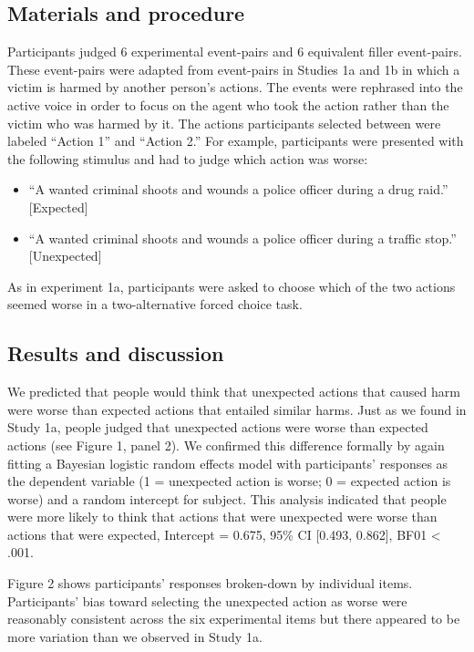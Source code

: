 \documentclass[10pt, letterpaper]{article}
\begin{document}
\subsection{Materials and procedure}\label{materials-and-procedure-1}

Participants judged 6 experimental event-pairs and 6 equivalent filler
event-pairs. These event-pairs were adapted from event-pairs in Studies
1a and 1b in which a victim is harmed by another person's actions. The
events were rephrased into the active voice in order to focus on the
agent who took the action rather than the victim who was harmed by it.
The actions participants selected between were labeled ``Action 1'' and
``Action 2.'' For example, participants were presented with the
following stimulus and had to judge which action was worse:

\begin{itemize}
\item
  ``A wanted criminal shoots and wounds a police officer during a drug
  raid.'' {[}Expected{]}
\item
  ``A wanted criminal shoots and wounds a police officer during a
  traffic stop.'' {[}Unexpected{]}
\end{itemize}

As in experiment 1a, participants were asked to choose which of the two
actions seemed worse in a two-alternative forced choice task.

\subsection{Results and discussion}\label{results-and-discussion-1}

We predicted that people would think that unexpected actions that caused
harm were worse than expected actions that entailed similar harms. Just
as we found in Study 1a, people judged that unexpected actions were
worse than expected actions (see Figure 1, panel 2). We confirmed this
difference formally by again fitting a Bayesian logistic random effects
model with participants' responses as the dependent variable (1 =
unexpected action is worse; 0 = expected action is worse) and a random
intercept for subject. This analysis indicated that people were more
likely to think that actions that were unexpected were worse than
actions that were expected, Intercept = 0.675, 95\% CI {[}0.493,
0.862{]}, BF01 \textless{} .001.

Figure 2 shows participants' responses broken-down by individual items.
Participants' bias toward selecting the unexpected action as worse were
reasonably consistent across the six experimental items but there
appeared to be more variation than we observed in Study 1a.
\end{document}
